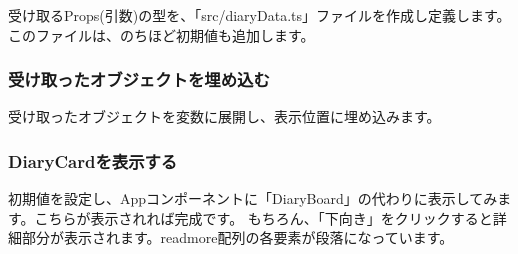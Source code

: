 受け取るProps(引数)の型を、「src/diaryData.ts」ファイルを作成し定義します。このファイルは、のちほど初期値も追加します。

\subsubsection*{受け取ったオブジェクトを埋め込む}
\keeplastskip{
  \label{sec:3-3-4-5}
  \label{sec-00332-5}
  \par\nobreak
}
\vspace*{\baselineskip}

受け取ったオブジェクトを変数に展開し、表示位置に埋め込みます。

\subsubsection*{DiaryCardを表示する}
\keeplastskip{
  \label{sec:3-3-4-6}
  \label{sec-00332-6}
  \par\nobreak
}

初期値を設定し、Appコンポーネントに「DiaryBoard」の代わりに表示してみます。こちらが表示されれば完成です。
もちろん、「下向き」をクリックすると詳細部分が表示されます。readmore配列の各要素が段落になっています。

